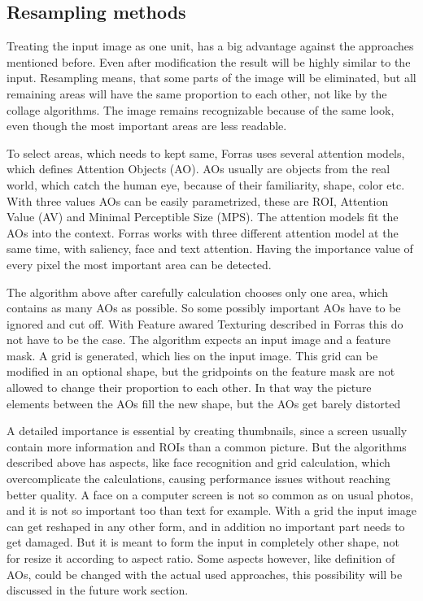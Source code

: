 \documentclass[draft,final]{vutinfth} %
\begin{document}
\subsection{Resampling methods}
Treating the input image as one unit, has a big advantage against the approaches mentioned before.
Even after modification the result will be highly similar to the input.
Resampling means, that some parts of the image will be eliminated, but all remaining areas will have the same proportion to each other, not like by the collage algorithms.
The image remains recognizable because of the same look, even though the most important areas are less readable.\par 
To select areas, which needs to kept same, Forras uses several attention models, which defines Attention Objects (AO).
AOs usually are objects from the real world, which catch the human eye, because of their familiarity, shape, color etc.
With three values AOs can be easily parametrized, these are ROI, Attention Value (AV) and Minimal Perceptible Size (MPS).
The attention models fit the AOs into the context.
Forras works with three different attention model at the same time, with saliency, face and text attention.
Having the importance value of every pixel the most important area can be detected.\par 
The algorithm above after carefully calculation chooses only one area, which contains as many AOs as possible.
So some possibly important AOs have to be ignored and cut off.
With Feature awared Texturing described in Forras this do not have to be the case.
The algorithm expects an input image and a feature mask.
A grid is generated, which lies on the input image.
This grid can be modified in an optional shape, but the gridpoints on the feature mask are not allowed to change their proportion to each other.
In that way the picture elements between the AOs fill the new shape, but the AOs get barely distorted\par 
A detailed importance is essential by creating thumbnails, since a screen usually contain more information and ROIs than a common picture. 
But the algorithms described above has aspects, like face recognition and grid calculation, which overcomplicate the calculations, causing performance issues without reaching better quality.
A face on a computer screen is not so common as on usual photos, and it is not so important too than text for example.
With a grid the input image can get reshaped in any other form, and in addition no important part needs to get damaged.
But it is meant to form the input in completely other shape, not for resize it according to aspect ratio.
Some aspects however, like definition of AOs, could be changed with the actual used approaches, this possibility will be discussed in the future work section.
\end{document}
